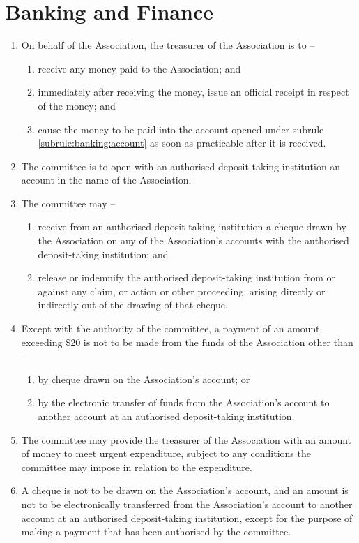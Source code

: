 \section{Banking and Finance}
\label{rule:banking}

\begin{enumerate}
	\item On behalf of the Association, the treasurer of the Association is to --
	\begin{enumerate}
		\item receive any money paid to the Association; and
		\item immediately after receiving the money, issue an official receipt in respect of the money; and
		\item cause the money to be paid into the account opened under subrule \ref{subrule:banking:account} as soon as practicable after it is received.
	\end{enumerate}
	
	\item \label{subrule:banking:account} The committee is to open with an authorised deposit-taking institution an account in the name of the Association.
	
	\item The committee may --
	\begin{enumerate}
		\item receive from an authorised deposit-taking institution a cheque drawn by the Association on any of the Association's accounts with the authorised deposit-taking institution; and
		\item release or indemnify the authorised deposit-taking institution from or against any claim, or action or other proceeding, arising directly or indirectly out of the drawing of that cheque.
	\end{enumerate}
	
	\item Except with the authority of the committee, a payment of an amount exceeding \$20 is not to be made from the funds of the Association other than --
	\begin{enumerate}
		\item by cheque drawn on the Association's account; or
		\item by the electronic transfer of funds from the Association's account to another account at an authorised deposit-taking institution.
	\end{enumerate}
	
	\item The committee may provide the treasurer of the Association with an amount of money to meet urgent expenditure, subject to any conditions the committee may impose in relation to the expenditure.
	\item A cheque is not to be drawn on the Association's account, and an amount is not to be electronically transferred from the Association's account to another account at an authorised deposit-taking institution, except for the purpose of making a payment that has been authorised by the committee.


\end{enumerate}
